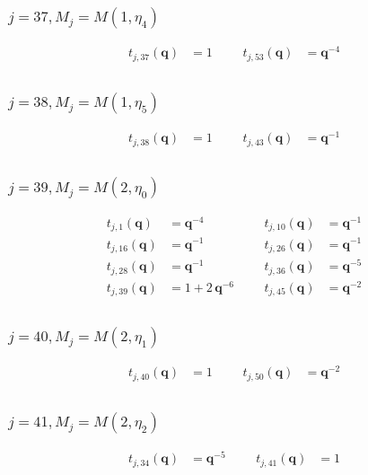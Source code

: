 \subsubsection{$j=37, M_{j}=M(1,\eta_{4})$}
\begin{align*}
t_{j,37}(\boldsymbol{q})&=1 &&& t_{j,53}(\boldsymbol{q})&=\boldsymbol{q}^{-4} \\
\end{align*}

\subsubsection{$j=38, M_{j}=M(1,\eta_{5})$}
\begin{align*}
t_{j,38}(\boldsymbol{q})&=1 &&& t_{j,43}(\boldsymbol{q})&=\boldsymbol{q}^{-1} \\
\end{align*}

\subsubsection{$j=39, M_{j}=M(2,\eta_{0})$}
\begin{align*}
t_{j,1}(\boldsymbol{q})&=\boldsymbol{q}^{-4} &&& t_{j,10}(\boldsymbol{q})&=\boldsymbol{q}^{-1} \\
t_{j,16}(\boldsymbol{q})&=\boldsymbol{q}^{-1} &&& t_{j,26}(\boldsymbol{q})&=\boldsymbol{q}^{-1} \\
t_{j,28}(\boldsymbol{q})&=\boldsymbol{q}^{-1} &&& t_{j,36}(\boldsymbol{q})&=\boldsymbol{q}^{-5} \\
t_{j,39}(\boldsymbol{q})&=1 + 2\,\boldsymbol{q}^{-6} &&& t_{j,45}(\boldsymbol{q})&=\boldsymbol{q}^{-2} \\
\end{align*}

\subsubsection{$j=40, M_{j}=M(2,\eta_{1})$}
\begin{align*}
t_{j,40}(\boldsymbol{q})&=1 &&& t_{j,50}(\boldsymbol{q})&=\boldsymbol{q}^{-2} \\
\end{align*}

\subsubsection{$j=41, M_{j}=M(2,\eta_{2})$}
\begin{align*}
t_{j,34}(\boldsymbol{q})&=\boldsymbol{q}^{-5} &&& t_{j,41}(\boldsymbol{q})&=1 \\
\end{align*}

